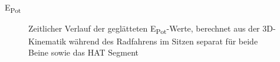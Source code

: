 \documentclass[
  letterpaper,
  DIV=11]{scrartcl}
\makeatletter
\let\oldparagraph\paragraph
\renewcommand{\paragraph}{
    \@ifstar
      \xxxParagraphStar
      \xxxParagraphNoStar
  }
\newcommand{\xxxParagraphStar}[1]{\oldparagraph*{#1}\mbox{}}
\newcommand{\xxxParagraphNoStar}[1]{\oldparagraph{#1}\mbox{}}
\makeatother
\begin{document}
\paragraph{\texorpdfstring{E\textsubscript{Pot}}{EPot}}

\begin{figure}


\caption{\label{fig-PInt_Kinematik_HAT_Epot_sitzen}Zeitlicher Verlauf
der geglätteten E\textsubscript{Pot}-Werte, berechnet aus der
3D-Kinematik während des Radfahrens im Sitzen separat für beide Beine
sowie das HAT Segment}

\end{figure}%
\end{document}
